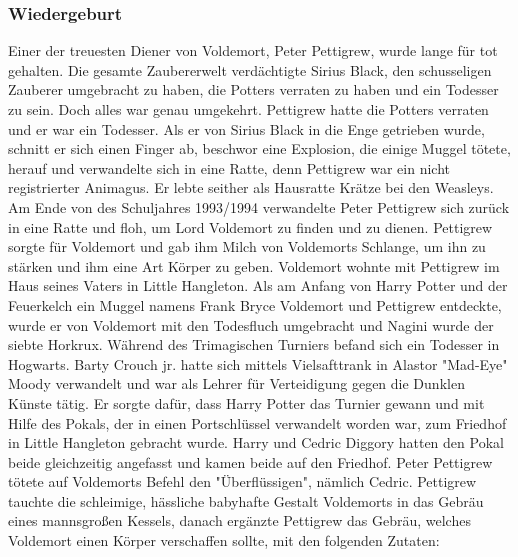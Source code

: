 \documentclass[a4paper, 10pt]{article}
\begin{document}
\subsubsection*{\large Wiedergeburt}
Einer der treuesten Diener von Voldemort, Peter Pettigrew, wurde lange für tot gehalten. Die gesamte Zaubererwelt verdächtigte Sirius Black, den schusseligen Zauberer umgebracht zu haben, die Potters verraten zu haben und ein Todesser zu sein. Doch alles war genau umgekehrt. Pettigrew hatte die Potters verraten und er war ein Todesser. Als er von Sirius Black in die Enge getrieben wurde, schnitt er sich einen Finger ab, beschwor eine Explosion, die einige Muggel tötete, herauf und verwandelte sich in eine Ratte, denn Pettigrew war ein nicht registrierter Animagus. Er lebte seither als Hausratte Krätze bei den Weasleys.
\vspace{10pt}
\newline
{}  
Am Ende von des Schuljahres 1993/1994 verwandelte Peter Pettigrew sich zurück in eine Ratte und floh, um Lord Voldemort zu finden und zu dienen.
\vspace{10pt}
\newline
{}  
Pettigrew sorgte für Voldemort und gab ihm Milch von Voldemorts Schlange, um ihn zu stärken und ihm eine Art Körper zu geben. Voldemort wohnte mit Pettigrew im Haus seines Vaters in Little Hangleton. Als am Anfang von Harry Potter und der Feuerkelch ein Muggel namens Frank Bryce Voldemort und Pettigrew entdeckte, wurde er von Voldemort mit den Todesfluch umgebracht und Nagini wurde der siebte Horkrux.
\vspace{10pt}
\newline
{}  
Während des Trimagischen Turniers befand sich ein Todesser in Hogwarts. Barty Crouch jr. hatte sich mittels Vielsafttrank in Alastor "Mad-Eye" Moody verwandelt und war als Lehrer für Verteidigung gegen die Dunklen Künste tätig. Er sorgte dafür, dass Harry Potter das Turnier gewann und mit Hilfe des Pokals, der in einen Portschlüssel verwandelt worden war, zum Friedhof in 
Little Hangleton gebracht wurde. Harry und Cedric Diggory hatten den Pokal beide gleichzeitig angefasst und kamen beide auf den Friedhof. Peter Pettigrew tötete auf Voldemorts Befehl den "Überflüssigen", nämlich Cedric.
\vspace{10pt}
\newline
{}  
Pettigrew tauchte die schleimige, hässliche babyhafte Gestalt Voldemorts in das Gebräu eines mannsgroßen Kessels, danach ergänzte Pettigrew das Gebräu, welches Voldemort einen Körper verschaffen sollte, mit den folgenden Zutaten:
\end{document}
